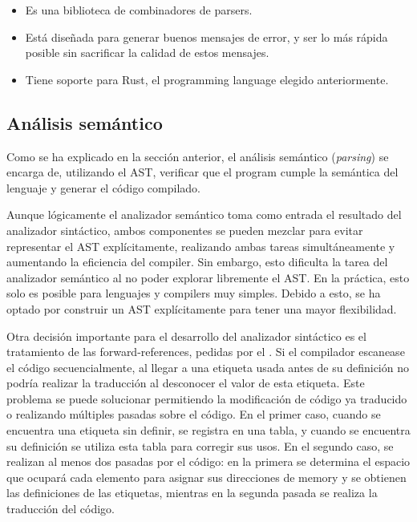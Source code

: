 \begin{itemize}
    \item Es una biblioteca de combinadores de \glspl{parser}.
    \item Está diseñada para generar buenos mensajes de error, y ser lo más
    rápida posible sin sacrificar la calidad de estos mensajes.
    \item Tiene soporte para Rust, el \gls{programming language} elegido
    anteriormente.
\end{itemize}

\subsection{Análisis semántico}\label{subsec:compiler}

Como se ha explicado en la sección anterior, el análisis semántico
(\textit{parsing}) se encarga de, utilizando el \gls{AST}, verificar que el
\gls{program} cumple la semántica del lenguaje y generar el código compilado.

Aunque lógicamente el analizador semántico toma como entrada el resultado del
analizador sintáctico, ambos componentes se pueden mezclar para evitar
representar el \gls{AST} explícitamente, realizando ambas tareas simultáneamente
y aumentando la eficiencia del \gls{compiler}. Sin embargo, esto dificulta la
tarea del analizador semántico al no poder explorar libremente el \gls{AST}. En
la práctica, esto solo es posible para lenguajes y \glspl{compiler} muy simples.
Debido a esto, se ha optado por construir un \gls{AST} explícitamente para tener
una mayor flexibilidad. \parencite{compiler-design}

Otra decisión importante para el desarrollo del analizador sintáctico es el
tratamiento de las \glspl{forward-reference}, pedidas por el
. Si el compilador escanease el código secuencialmente,
al llegar a una etiqueta usada antes de su definición no podría realizar la
traducción al desconocer el valor de esta etiqueta. Este problema se puede
solucionar permitiendo la modificación de código ya traducido o realizando
múltiples pasadas sobre el código. En el primer caso, cuando se encuentra una
etiqueta sin definir, se registra en una tabla, y cuando se encuentra su
definición se utiliza esta tabla para corregir sus usos. En el segundo caso, se
realizan al menos dos pasadas por el código: en la primera se determina el
espacio que ocupará cada elemento para asignar sus direcciones de \gls{memory} y
se obtienen las definiciones de las etiquetas, mientras en la segunda pasada se
realiza la traducción del código. \parencite{assembler-design}

